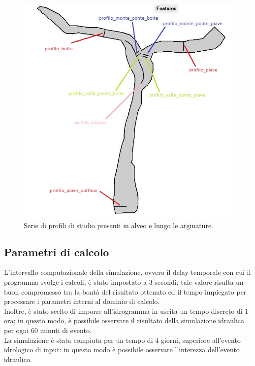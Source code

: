 \begin{figure}[htb] \centering
    \includegraphics[scale=0.7]{immagini/profili.JPG}
    \caption{Serie di profili di studio presenti in alveo e lungo le arginature.}
    \label{figure:profili}
\end{figure}

\subsection{Parametri di calcolo}
L'intervallo computazionale della simulazione, ovvero il delay temporale con cui il programma svolge i calcoli, è stato impostato a 3 secondi; tale valore risulta un buon compromesso tra la bontà del risultato ottenuto ed il tempo impiegato per processare i parametri interni al dominio di calcolo.\\
Inoltre, è stato scelto di imporre all'idrogramma in uscita un tempo discreto di 1 ora; in questo modo, è possibile osservare il risultato della simulazione idraulica per ogni 60 minuti di evento.\\
La simulazione è stata compiuta per un tempo di 4 giorni, superiore all'evento idrologico di input: in questo modo è possibile osservare l'interezza dell'evento idraulico. 